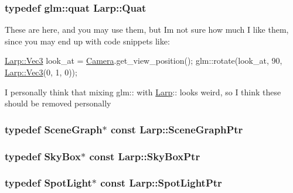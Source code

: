 \subsubsection[{\texorpdfstring{Quat}{Quat}}]{\setlength{\rightskip}{0pt plus 5cm}typedef glm\+::quat {\bf Larp\+::\+Quat}}\hypertarget{namespaceLarp_a24b78f83da1be54c0645d80ca4f47b39}{}\label{namespaceLarp_a24b78f83da1be54c0645d80ca4f47b39}
These are here, and you may use them, but I\textquotesingle{}m not sure how much I like them, since you may end up with code snippets like\+:


\begin{DoxyCode}
\hyperlink{namespaceLarp_a477b379311661e072acd751be3d473aa}{Larp::Vec3} look\_at = \hyperlink{classCamera}{Camera}.get\_view\_position();
glm::rotate(look\_at, 90, \hyperlink{namespaceLarp_a477b379311661e072acd751be3d473aa}{Larp::Vec3}(0, 1, 0));
\end{DoxyCode}


I personally think that mixing glm\+:\+: with \hyperlink{namespaceLarp}{Larp}\+:\+: looks weird, so I think these should be removed personally 
\subsubsection[{\texorpdfstring{Scene\+Graph\+Ptr}{SceneGraphPtr}}]{\setlength{\rightskip}{0pt plus 5cm}typedef {\bf Scene\+Graph}$\ast$ const {\bf Larp\+::\+Scene\+Graph\+Ptr}}\hypertarget{namespaceLarp_acf02d81e4b52238dcd17cb6249eadadc}{}\label{namespaceLarp_acf02d81e4b52238dcd17cb6249eadadc}
\subsubsection[{\texorpdfstring{Sky\+Box\+Ptr}{SkyBoxPtr}}]{\setlength{\rightskip}{0pt plus 5cm}typedef {\bf Sky\+Box}$\ast$ const {\bf Larp\+::\+Sky\+Box\+Ptr}}\hypertarget{namespaceLarp_a09c73976019d9e892b1b3c995d9a9430}{}\label{namespaceLarp_a09c73976019d9e892b1b3c995d9a9430}
\subsubsection[{\texorpdfstring{Spot\+Light\+Ptr}{SpotLightPtr}}]{\setlength{\rightskip}{0pt plus 5cm}typedef {\bf Spot\+Light}$\ast$ const {\bf Larp\+::\+Spot\+Light\+Ptr}}\hypertarget{namespaceLarp_a5366be98946441fcea9b8a155bc52d95}{}\label{namespaceLarp_a5366be98946441fcea9b8a155bc52d95}
